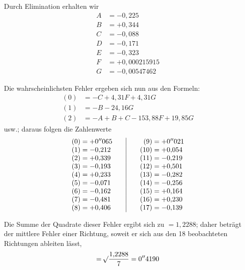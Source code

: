 Durch Elimination erhalten wir
\[
\begin{aligned}
A&=-0{,}225\\
B&=+0{,}344\\
C&=-0{,}088\\
D&=-0{,}171\\
E&=-0{,}323\\
F&=+0{,}000215915\\
G&=-0{,}00547462
\end{aligned}
\]

Die wahrscheinlichsten Fehler ergeben sich nun aus den Formeln:
\[
\begin{aligned}
(0)&=-C+4{,}31F+4{,}31G\\
(1)&=-B-24{,}16G\\
(2)&=-A+B+C-153{,}88F+19{,}85G
\end{aligned}
\]
usw.; daraus folgen die Zahlenwerte
\[
\begin{array}{r@{\;}l@{\qquad}|@{\qquad}r@{\;}l}
(0)=&+0''065&(9)=&+0''021\\
(1)=&-0{,}212&(10)=&+0{,}054\\
(2)=&+0{,}339&(11)=&-0{,}219\\
(3)=&-0{,}193&(12)=&+0{,}501\\
(4)=&+0{,}233&(13)=&-0{,}282\\
(5)=&-0{,}071&(14)=&-0{,}256\\
(6)=&-0{,}162&(15)=&+0{,}164\\
(7)=&-0{,}481&(16)=&+0{,}230\\
(8)=&+0{,}406&(17)=&-0{,}139
\end{array}
\]

Die Summe der Quadrate dieser Fehler ergibt sich zu \(=1{,}2288\); daher beträgt der mittlere Fehler einer Richtung, soweit er sich aus den 18 beobachteten Richtungen ableiten lässt,
\[
=\mathord{{}^{}\!\surd}\frac{1{,}2288}{7}=0''4190
\]

